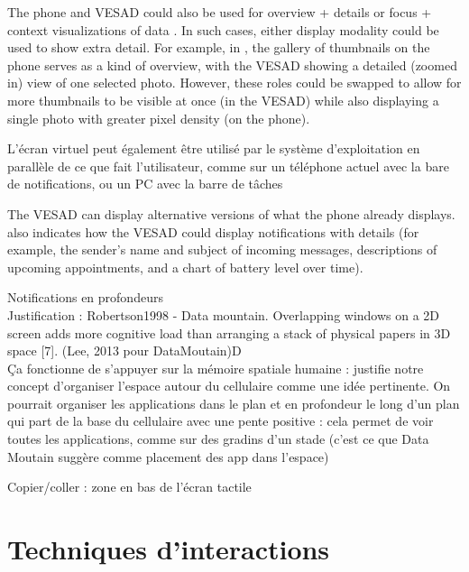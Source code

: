 The phone and VESAD could also be used for overview + details or focus + context visualizations of data \cite{cockburn2009,burigat2013}. In such cases, either display modality could be used to show extra detail. For example, in , the gallery of thumbnails on the phone serves as a kind of overview, with the VESAD showing a detailed (zoomed in) view of one selected photo. However, these roles could be swapped to allow for more thumbnails to be visible at once (in the VESAD) while also displaying a single photo with greater pixel density (on the phone).


L'écran virtuel peut également être utilisé par le système d'exploitation en parallèle de ce que fait l'utilisateur, comme sur un téléphone actuel avec la bare de notifications, ou un PC avec la barre de tâches

The VESAD can display alternative versions of what the phone already displays.  also indicates how the VESAD could display notifications with details (for example, the sender's name and subject of incoming messages,
descriptions of upcoming appointments, and a chart of battery level over time).

Notifications en profondeurs\\
Justification : Robertson1998 - Data mountain. Overlapping windows on a 2D screen adds more cognitive load than arranging a stack of physical papers in  3D space [7]. (Lee, 2013 pour DataMoutain)D\\
Ça fonctionne de s'appuyer sur la mémoire spatiale humaine : justifie notre concept d'organiser l'espace autour du cellulaire comme une idée pertinente. On pourrait organiser les applications dans le plan et en profondeur le long d'un plan qui part de la base du cellulaire avec une pente positive : cela permet de voir toutes les applications, comme sur des gradins d'un stade (c'est ce que Data Moutain suggère comme placement des app dans l'espace)

Copier/coller : zone en bas de l'écran tactile


\section{Techniques d'interactions}
\label{sec:concept_interaction_techniques}

